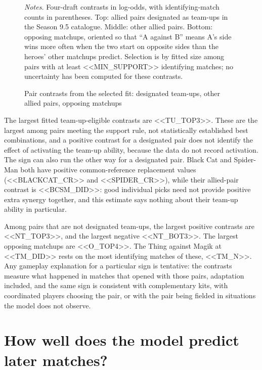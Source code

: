 \documentclass[11pt]{article}
\begin{document}
\begin{figure}[H]\centering
\caption{Pair contrasts from the selected fit: designated team-ups, other allied pairs, opposing matchups}
\label{fig:pairs}
\vspace{2pt}


\begin{minipage}{0.95\linewidth}\footnotesize\vspace{2pt}
\emph{Notes.} Four-draft contrasts in log-odds, with identifying-match counts in parentheses. Top:
allied pairs designated as team-ups in the Season 9.5 catalogue. Middle: other allied pairs. Bottom:
opposing matchups, oriented so that ``A against B'' means A's side wins more often when the two start on
opposite sides than the heroes' other matchups predict. Selection is by fitted size among pairs with at
least <<MIN_SUPPORT>> identifying matches; no uncertainty has been computed for these contrasts.
\end{minipage}
\end{figure}

The largest fitted team-up-eligible contrasts are <<TU_TOP3>>. These are the largest among pairs meeting
the support rule, not statistically established best combinations, and a positive contrast for a
designated pair does not identify the effect of activating the team-up ability, because the data do not
record activation. The sign can also run the other way for a designated pair. Black Cat and Spider-Man
both have positive common-reference replacement values (<<BLACKCAT_CR>> and <<SPIDER_CR>>), while their
allied-pair contrast is <<BCSM_DID>>: good individual picks need not provide positive extra synergy
together, and this estimate says nothing about their team-up ability in particular.

Among pairs that are not designated team-ups, the largest positive contrasts are <<NT_TOP3>>, and the
largest negative <<NT_BOT3>>. The largest opposing matchups are <<O_TOP4>>. The Thing against Magik at
<<TM_DID>> rests on the most identifying matches of these, <<TM_N>>. Any gameplay explanation for a
particular sign is tentative: the contrasts measure what happened in matches that opened with those pairs,
adaptation included, and the same sign is consistent with complementary kits, with coordinated players
choosing the pair, or with the pair being fielded in situations the model does not observe.

\section*{How well does the model predict later matches?}
\end{document}
